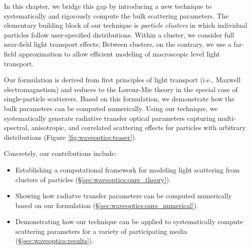 In this chapter, we bridge this gap by introducing a new technique to systematically and rigorously compute the bulk scattering parameters.
The elementary building block of our technique is \emph{particle clusters} in which individual particles follow user-specified distributions.
Within a cluster, we consider full near-field light transport effects; Between clusters, on the contrary, we use a far-field approximation to allow efficient modeling of macroscopic level light transport.

Our formulation is derived from first principles of light transport (i.e., Maxwell electromagnetism) and reduces to the Lorenz-Mie theory in the special case of single-particle scatterers. Based on this formulation, we demonstrate how the bulk parameters can be computed numerically. Using our technique, we systematically generate radiative transfer optical parameters capturing multi-spectral, anisotropic, and correlated scattering effects for particles with arbitrary distributions (Figure \ref{fig:waveoptics:teaser}).

Concretely, our contributions include:
\begin{itemize}
    \item Establishing a computational framework for modeling light scattering from clusters of particles (\S\ref{sec:waveoptics:ours_theory}).
    \item Showing how radiatve transfer parameters can be computed numerically based on our formulation (\S\ref{sec:waveoptics:ours_numerical}).
    \item Demonstrating how our technique can be applied to systematically compute scattering parameters for a variety of participating media (\S\ref{sec:waveoptics:results}).
\end{itemize}
